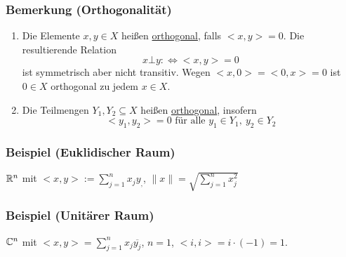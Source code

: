 \subsubsection{Bemerkung (Orthogonalität)}
\begin{enumerate}
\item Die Elemente $x,y\in X$ heißen \underline{orthogonal}, falls $<x,y>=0$.  Die resultierende Relation 
\[x \bot y :\Leftrightarrow <x,y>=0\]
ist symmetrisch aber nicht transitiv.  Wegen $<x,0>=<0,x>=0$ ist $0\in X$ orthogonal zu jedem $x\in X$.
\item Die Teilmengen $Y_1,Y_2\subseteq X$ heißen \underline{orthogonal}, insofern
\[<y_1,y_2>=0\text{ für alle }y_1\in Y_1,\ y_2\in Y_2\]
\end{enumerate}
\subsubsection{Beispiel (Euklidischer Raum)}
$\mathbb{R} ^n$ mit $<x,y>:=\sum _{j=1}^n x_jy_,$, $\|x\|=\sqrt{\sum _{j=1}^nx_j^2}$
\subsubsection{Beispiel (Unitärer Raum)}
$\mathbb{C} ^n$ mit $<x,y>=\sum _{j=1}^n x_j \overline{y_j}$, $n=1$, $<i,i>=i\cdot (-1)=1$.
